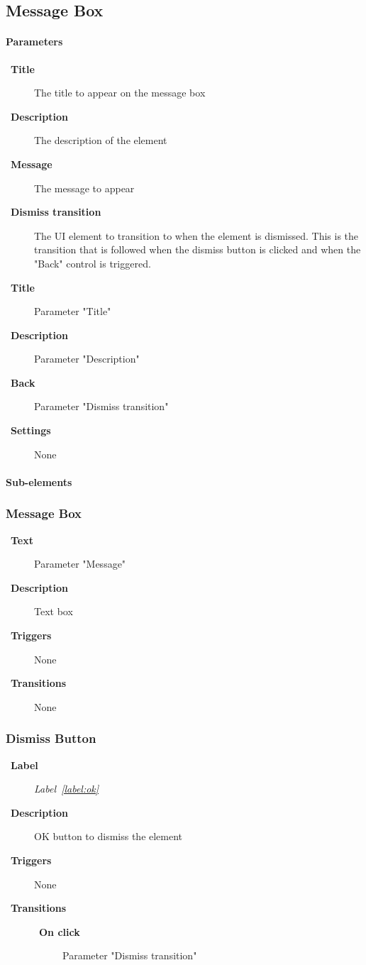 \documentclass[a4paper,10pt]{article}
\newcommand{\labelLabelText}{Label}
\newcommand{\labelLabel}{label:}
\DeclareRobustCommand{\labelRef}[1]{%
   \emph{\labelLabelText~\ref{\labelLabel#1}}}
\newcommand{\elementLabel}{element:}
\DeclareRobustCommand{\element}[2]{\subsection{#1}\label{\elementLabel#2}}
\let\Item\item
\newcommand\SpecialItem{\renewcommand\item[1][]{\Item[\textbullet~\bfseries##1]}
}
\begin{document}
\element{Message Box}{message_box}

\paragraph{Parameters}
\SpecialItem
\begin{description}
 \item[Title] The title to appear on the message box
 \item[Description] The description of the element
 \item[Message] The message to appear
 \item[Dismiss transition] The UI element to transition to when the element is 
dismissed. This is the transition that is followed when the dismiss button is 
clicked and when the "Back" control is triggered.
\end{description}

\begin{description}
 \item[Title] Parameter "Title"
 \item[Description] Parameter "Description"
 \item[Back] Parameter "Dismiss transition"
 \item[Settings] None
\end{description}

\paragraph{Sub-elements}

\subsubsection{Message Box}
\begin{description}
 \item[Text] Parameter "Message"
 \item[Description] Text box
 \item[Triggers] None
 \item[Transitions] None
\end{description}

\subsubsection{Dismiss Button}
\begin{description}
 \item[Label] \labelRef{ok}
 \item[Description] OK button to dismiss the element
 \item[Triggers] None
 \item[Transitions]\mbox{}
 \begin{description}
  \item[On click] Parameter "Dismiss transition"
 \end{description}
\end{description}
\end{document}
